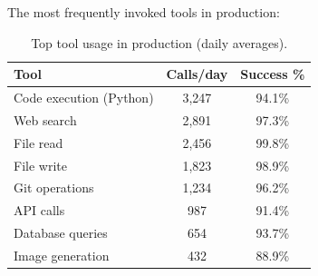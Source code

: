 The most frequently invoked tools in production:

\begin{table}[H]
\centering
\small
\begin{tabular}{lcc}
\toprule
\textbf{Tool} & \textbf{Calls/day} & \textbf{Success \%} \\
\midrule
Code execution (Python) & 3,247 & 94.1\% \\
Web search & 2,891 & 97.3\% \\
File read & 2,456 & 99.8\% \\
File write & 1,823 & 98.9\% \\
Git operations & 1,234 & 96.2\% \\
API calls & 987 & 91.4\% \\
Database queries & 654 & 93.7\% \\
Image generation & 432 & 88.9\% \\
\bottomrule
\end{tabular}
\caption{Top tool usage in production (daily averages).}
\label{tab:tool_usage}
\end{table}

